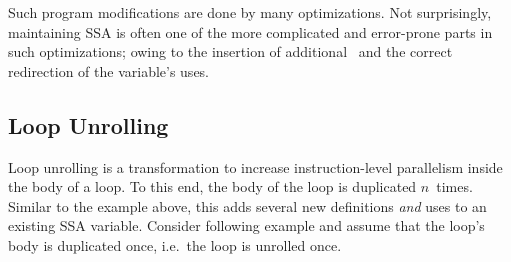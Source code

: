 \begin{figure}[htbp]
	\centering
	\phantom{XXX}
	\label{fig:withphis}
\end{figure}

Such program modifications are done by many optimizations. 
Not surprisingly, maintaining SSA is often one of the more complicated and error-prone parts in such optimizations;
owing to the insertion of additional \phiops\ and the correct redirection of the variable's uses.

\subsection{Loop Unrolling}

Loop unrolling is a transformation to increase instruction-level parallelism inside the body of a loop.
To this end, the body of the loop is duplicated $n$~times. 
Similar to the example above, this adds several new definitions \emph{and} uses to an existing SSA variable. 
Consider following example and assume that the loop's body is duplicated once, i.e.~the loop is unrolled once.

